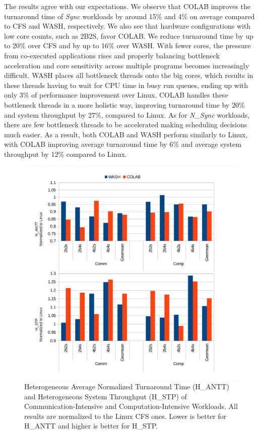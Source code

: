 The results agree with our expectations. We observe that COLAB improves the turnaround time of \emph{Sync} workloads by around 15\% and 4\% on average compared to CFS and WASH, respectively. We also see that hardware configurations with low core counts, such as 2B2S, favor COLAB. We reduce turnaround time by up to 20\% over CFS and by up to 16\% over WASH. With fewer cores, the pressure from co-executed applications rises and properly balancing bottleneck acceleration and core sensitivity across multiple programs becomes increasingly difficult. WASH places all bottleneck threads onto the big cores, which results in these threads having to wait for CPU time in busy run queues, ending up with only 3\% of performance improvement over Linux. COLAB handles these bottleneck threads in a more holistic way, improving turnaround time by 20\% and system throughput by 27\%, compared to Linux.
As for \emph{N\_Sync} workloads, there are few bottleneck threads to be accelerated making scheduling decisions much easier. As a result, both COLAB and WASH perform similarly to Linux, with COLAB improving average turnaround time by 6\% and average system throughput by 12\% compared to Linux.

\begin{figure}
\centering
\includegraphics[scale=0.55]{figures/com.pdf}
\caption{Heterogeneous Average Normalized Turnaround Time (H\_ANTT) and Heterogeneous System Throughput (H\_STP) of Communication-Intensive and Computation-Intensive Workloads. All results are normalized to the Linux CFS ones. Lower is better for H\_ANTT and higher is better for H\_STP.}
\label{com}
\end{figure} 

